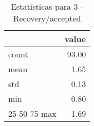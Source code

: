 \begin{table}[htbp]
\caption{Estatísticas para 3 - Recovery/accepted}
\label{tab:3_-_recovery_accepted_summary}
\begin{tabular}{lr}
\toprule
 & value \\
\midrule
count & 93.00 \\
mean & 1.65 \\
std & 0.13 \\
min & 0.80 \\
25%
50%
75%
max & 1.69 \\
\bottomrule
\end{tabular}
\end{table}
